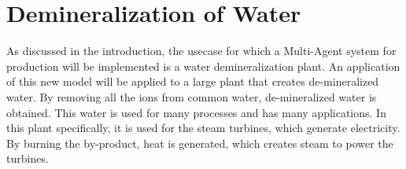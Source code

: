 %		
%

\section{Demineralization of Water}
As discussed in the introduction, the usecase for which a Multi-Agent system for production will be implemented is a water demineralization plant. An application of this new model will be applied to a large plant that creates de-mineralized water. By removing all the ions from common water, de-mineralized water is obtained. This water is used for many processes and has many applications. In this plant specifically, it is used for the steam turbines, which generate electricity. By burning the by-product, heat is generated, which creates steam to power the turbines. 


